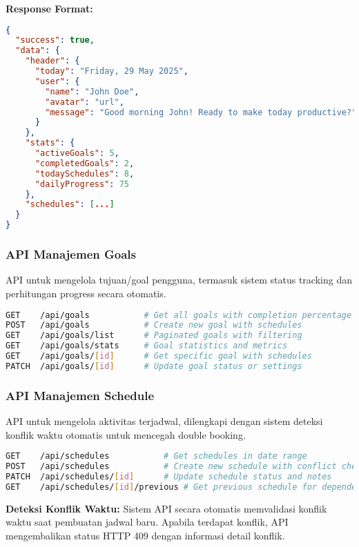 \textbf{Response Format:}
\begin{lstlisting}[language=JSON, caption=Dashboard Combined Response]
{
  "success": true,
  "data": {
    "header": {
      "today": "Friday, 29 May 2025",
      "user": {
        "name": "John Doe",
        "avatar": "url",
        "message": "Good morning John! Ready to make today productive?"
      }
    },
    "stats": {
      "activeGoals": 5,
      "completedGoals": 2,
      "todaySchedules": 8,
      "dailyProgress": 75
    },
    "schedules": [...]
  }
}
\end{lstlisting}

\subsubsection{API Manajemen Goals}

API untuk mengelola tujuan/goal pengguna, termasuk sistem status tracking dan perhitungan progress secara otomatis.

\begin{lstlisting}[language=bash, caption=Goals API Endpoints]
GET    /api/goals           # Get all goals with completion percentage
POST   /api/goals           # Create new goal with schedules
GET    /api/goals/list      # Paginated goals with filtering
GET    /api/goals/stats     # Goal statistics and metrics
GET    /api/goals/[id]      # Get specific goal with schedules
PATCH  /api/goals/[id]      # Update goal status or settings
\end{lstlisting}

\subsubsection{API Manajemen Schedule}

API untuk mengelola aktivitas terjadwal, dilengkapi dengan sistem deteksi konflik waktu otomatis untuk mencegah double booking.

\begin{lstlisting}[language=bash, caption=Schedule API Endpoints]
GET    /api/schedules           # Get schedules in date range
POST   /api/schedules           # Create new schedule with conflict check
PATCH  /api/schedules/[id]      # Update schedule status and notes
GET    /api/schedules/[id]/previous # Get previous schedule for dependency
\end{lstlisting}

\textbf{Deteksi Konflik Waktu:}
Sistem API secara otomatis memvalidasi konflik waktu saat pembuatan jadwal baru. Apabila terdapat konflik, API mengembalikan status HTTP 409 dengan informasi detail konflik.


